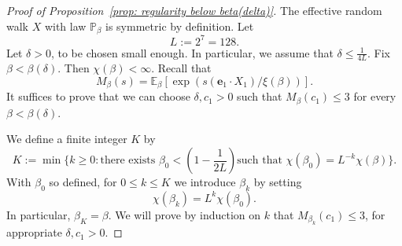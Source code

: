 \documentclass[11pt,a4paper]{article}
\numberwithin{equation}{section}
\theoremstyle{plain}
\theoremstyle{definition}
\newcommand\1{\mathds{1}}
\begin{document}
\begin{proof}[Proof of Proposition~\textup{\ref{prop: regularity below beta(delta)}}]
The effective random walk $X$ with law $\mathbb P_\beta$ is symmetric by definition.
Let
\begin{equation}
    L:= 2^7 = 128.
    \end{equation}
Let $\delta>0$, to be chosen small enough. In particular, we assume that
$\delta\leq \frac{1}{4L}$.
Fix $\beta< \beta(\delta)$.  Then $\chi(\beta)<\infty$.
Recall that
\begin{equation}
    M_\beta(s)
    =
    \mathbb E_\beta[\exp(s( \mathbf{e}_1\cdot X_1)/\xi(\beta))].
\end{equation}
It suffices to prove that we can choose $\delta,c_1>0$ such
that $M_\beta(c_1)\leq 3$ for every $\beta< \beta(\delta)$.


We define a finite integer $K$ by
\begin{equation}
    K := \min\Big\{k \ge 0 : \text{there exists $\beta_0 < (1-\textstyle\frac{1}{2L})$
    such that $\chi(\beta_0)=L^{-k}\chi(\beta)$}\Big\}.
\end{equation}
With $\beta_0$ so defined, for $0 \le k \le K$ we introduce $\beta_k$ by setting
\begin{equation}
    \chi(\beta_k) = L^k \chi(\beta_0).
\end{equation}
In particular, $\beta_K=\beta$.
We will prove by induction on $k$ that $M_{\beta_k}(c_1) \le 3$,
for appropriate $\delta,c_1>0$.


\end{proof}
\end{document}
